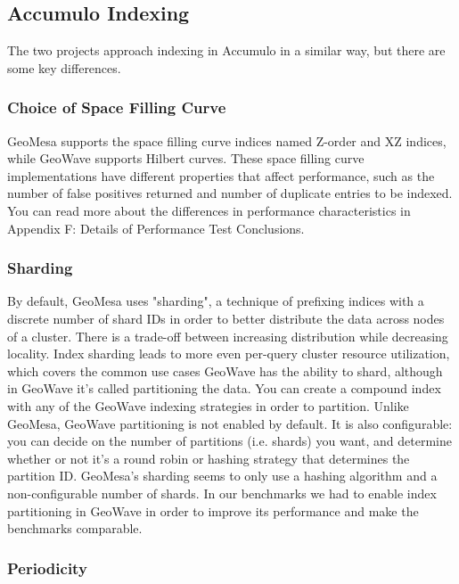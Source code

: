 \subsection{Accumulo Indexing}
\label{sec:featurecompare:indexing}

The two projects approach indexing in Accumulo in a similar way, but there are some key differences.


\subsubsection{Choice of Space Filling Curve}
\label{sec:featurecompare:indexing:curve}

GeoMesa supports the space filling curve indices named Z-order and XZ indices, while GeoWave supports Hilbert curves.
These space filling curve implementations have different properties that affect performance, such as the number of false positives returned and number of duplicate entries to be indexed.
You can read more about the differences in performance characteristics in Appendix F: Details of Performance Test Conclusions.


\subsubsection{Sharding}
\label{sec:featurecompare:indexing:sharding}

By default, GeoMesa uses "sharding", a technique of prefixing indices with a discrete number of shard IDs in order to better distribute the data across nodes of a cluster.
There is a trade-off between increasing distribution while decreasing locality.
Index sharding leads to more even per-query cluster resource utilization, which covers the common use cases GeoWave has the ability to shard, although in GeoWave it's called partitioning the data.
You can create a compound index with any of the GeoWave indexing strategies in order to partition.
Unlike GeoMesa, GeoWave partitioning is not enabled by default.
It is also configurable: you can decide on the number of partitions (i.e. shards) you want, and determine whether or not it's a round robin or hashing strategy that determines the partition ID.
GeoMesa's sharding seems to only use a hashing algorithm and a non-configurable number of shards.
In our benchmarks we had to enable index partitioning in GeoWave in order to improve its performance and make the benchmarks comparable.


\subsubsection{Periodicity}
\label{sec:featurecompare:indexing:periodicity}

